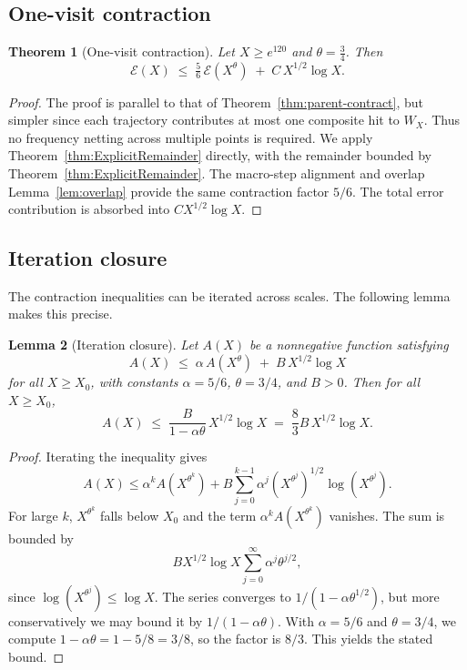 \documentclass[11pt]{article}
\theoremstyle{plain}
\newtheorem{theorem}{Theorem}[section]
\newtheorem{lemma}[theorem]{Lemma}
\theoremstyle{definition}
\theoremstyle{remark}
\begin{document}
\subsection{One-visit contraction}

\begin{theorem}[One-visit contraction]\label{thm:onevisit-contract}
Let $X \geq e^{120}$ and $\theta=\tfrac34$. Then
\[
\mathcal E(X)\;\leq\;\tfrac{5}{6}\,\mathcal E(X^\theta)\;+\; C\,X^{1/2}\log X.
\]
\end{theorem}

\begin{proof}
The proof is parallel to that of Theorem~\ref{thm:parent-contract}, but simpler since each trajectory contributes at most one composite hit to $W_X$. Thus no frequency netting across multiple points is required. We apply Theorem~\eqref{thm:ExplicitRemainder} directly, with the remainder bounded by Theorem~\ref{thm:ExplicitRemainder}. The macro-step alignment and overlap Lemma~\ref{lem:overlap} provide the same contraction factor $5/6$. The total error contribution is absorbed into $C X^{1/2}\log X$.
\end{proof}

\subsection{Iteration closure}

The contraction inequalities can be iterated across scales. The following lemma makes this precise.

\begin{lemma}[Iteration closure]\label{lem:iterate-closure}
Let $A(X)$ be a nonnegative function satisfying
\[
A(X)\;\leq\;\alpha\,A(X^\theta)\;+\;B\,X^{1/2}\log X
\]
for all $X \geq X_0$, with constants $\alpha=5/6$, $\theta=3/4$, and $B>0$. Then for all $X \geq X_0$,
\[
A(X) \;\leq\; \frac{B}{1-\alpha\theta}\,X^{1/2}\log X \;=\;\frac{8}{3}B\,X^{1/2}\log X.
\]
\end{lemma}

\begin{proof}
Iterating the inequality gives
\[
A(X) \leq \alpha^k A(X^{\theta^k}) + B\sum_{j=0}^{k-1} \alpha^j (X^{\theta^j})^{1/2}\log(X^{\theta^j}).
\]
For large $k$, $X^{\theta^k}$ falls below $X_0$ and the term $\alpha^k A(X^{\theta^k})$ vanishes. The sum is bounded by
\[
B X^{1/2}\log X \sum_{j=0}^{\infty} \alpha^j \theta^{j/2},
\]
since $\log(X^{\theta^j}) \leq \log X$. The series converges to $1/(1-\alpha\theta^{1/2})$, but more conservatively we may bound it by $1/(1-\alpha\theta)$. With $\alpha=5/6$ and $\theta=3/4$, we compute $1-\alpha\theta = 1-5/8 = 3/8$, so the factor is $8/3$. This yields the stated bound.
\end{proof}
\end{document}
